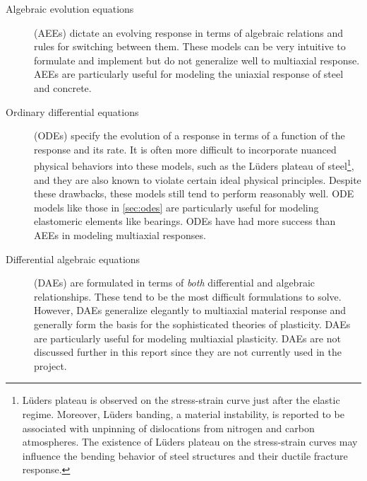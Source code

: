 \begin{description}
    \item[Algebraic evolution equations] (AEEs) dictate an evolving response in terms of algebraic relations and rules for switching between them. These models can be very intuitive to formulate and implement but do not generalize well to multiaxial response. AEEs are particularly useful for modeling the uniaxial response of steel and concrete.
    \item[Ordinary differential equations] (ODEs)
    specify the evolution of a response in terms of a function of the response and its rate. It is often more difficult to incorporate nuanced physical behaviors into these models, such as the L\"uders plateau of steel{\footnote{L\"uders plateau is observed on the stress-strain curve just after the elastic regime. Moreover, L\"uders banding, a material instability, is reported to be associated with unpinning of dislocations from nitrogen and carbon atmospheres. The existence of L\"uders plateau on the stress-strain curves may influence the bending behavior of steel structures and their ductile fracture response.}}, and they are also known to violate certain ideal physical principles. Despite these drawbacks, these models still tend to perform reasonably well. ODE models like those in \cref{sec:odes} are particularly useful for modeling elastomeric elements like bearings.
    ODEs have had more success than AEEs in modeling multiaxial responses.
    \item[Differential algebraic equations] (DAEs) are formulated in terms of \emph{both} differential and algebraic relationships. These tend to be the most difficult formulations to solve. However, DAEs generalize elegantly to multiaxial material response and generally form the basis for the sophisticated theories of plasticity. DAEs are particularly useful for modeling multiaxial plasticity. DAEs are not discussed further in this report since they are not currently used in the \BRACE{} project.
\end{description}




 